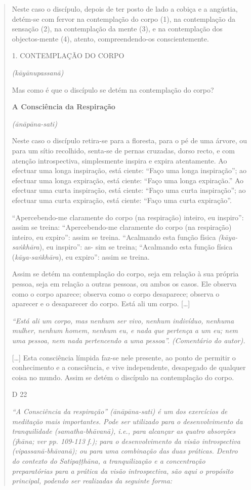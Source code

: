 \begin{quote}
Neste caso o discípulo, depois de ter posto de lado a cobiça e a angústia, detém-se com fervor na contemplação do corpo (1), na contemplação da sensação (2), na contemplação da mente (3), e na contemplação dos objectos-mente (4), atento, compreendendo-os conscientemente.

1. CONTEMPLAÇÃO DO CORPO

\emph{(kāyānupassanā)}

Mas como é que o discípulo se detém na contemplação do corpo?

\textbf{A Consciência da Respiração}

\emph{(ānāpāna-sati)}

Neste caso o discípulo retira-se para a floresta, para o pé de uma árvore, ou para um sítio recolhido, senta-se de pernas cruzadas, dorso recto, e com atenção introspectiva, simplesmente inspira e expira atentamente. Ao efectuar uma longa inspiração, está ciente: ``Faço uma longa inspiração''; ao efectuar uma longa expiração, está ciente: ``Faço uma longa expiração.'' Ao efectuar uma curta inspiração, está ciente: ``Faço uma curta inspiração''; ao efectuar uma curta expiração, está ciente: ``Faço uma curta expiração''.

``Apercebendo-me claramente do corpo (na respiração) inteiro, eu inspiro'': assim se treina: ``Apercebendo-me claramente do corpo (na respiração) inteiro, eu expiro'': assim se treina. ``Acalmando esta função física \emph{(kāya-saṅkhāra}), eu inspiro'': as- sim se treina; ``Acalmando esta função física (\emph{kāya-saṅkhāra}), eu expiro'': assim se treina.

Assim se detém na contemplação do corpo, seja em relação à sua própria pessoa, seja em relação a outras pessoas, ou ambos os casos. Ele observa como o corpo aparece; observa como o corpo desaparece; observa o aparecer e o desaparecer do corpo. Está ali um corpo. {[}\ldots{]}

\emph{``Está ali um corpo, mas nenhum ser vivo, nenhum indivíduo, nenhuma mulher, nenhum homem, nenhum eu, e nada que pertença a um eu; nem uma pessoa, nem nada pertencendo a uma pessoa''. (Comentário do autor).}

{[}\ldots{]} Esta consciência límpida faz-se nele presente, ao ponto de permitir o conhecimento e a consciência, e vive independente, desapegado de qualquer coisa no mundo. Assim se detém o discípulo na contemplação do corpo.

D 22

\emph{``A Consciência da respiração'' (ānāpāna-sati) é um dos exercícios de meditação mais importantes. Pode ser utilizado para o desenvolvimento da tranquilidade (samatha-bhāvanā), i.e., para alcançar as quatro absorções (jhāna; ver pp. 109-113 f.); para o desenvolvimento da visão introspectiva (vipassanā-bhāvanā); ou para uma combinação das duas práticas. Dentro do contexto do Satipaṭṭhāna, a tranquilização e a concentração preparatórias para a prática da visão introspectiva, são aqui o propósito principal, podendo ser realizadas da seguinte forma:}


\end{quote}
